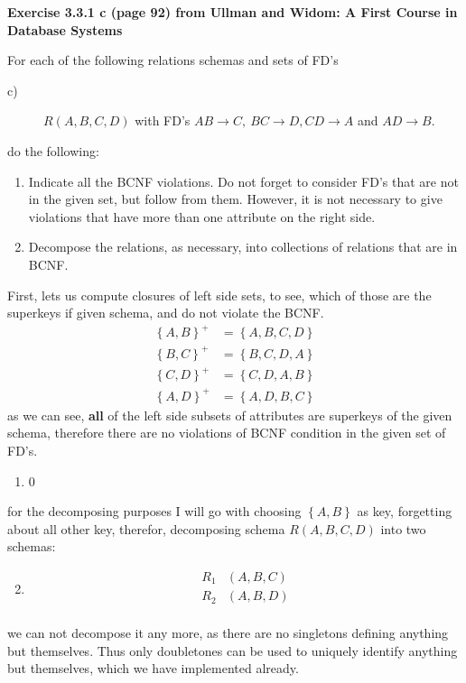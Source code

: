 \documentclass[a4paper]{article}
\newcommand{\set}[1]{\left\{#1\right\}}
\newcommand{\ra}{\rightarrow}
\newenvironment{problem}[1][\unskip]%
{\centering\textbf{ #1}%

\vspace{0.5cm}
\begin{em}}%
{\end{em}}
\newenvironment{answer}%
{\begin{framed}%
\vspace{0.5cm}}%
{\end{framed}\vspace{0.5cm}}
\begin{document}
	\newpage
	\begin{problem}[Exercise 3.3.1 c (page 92) from Ullman and Widom: A First Course in Database Systems]
		For each of the following relations schemas and sets of FD's
		\begin{description}
			\item[c)] $R(A,B,C,D)$ with FD's $AB \ra C,\ BC \ra D, CD \ra A$ and $AD \ra B$.
		\end{description}
		do the following:
		\begin{enumerate}
			\item Indicate all the BCNF violations. Do not forget to consider FD's that are not in the given set, but follow from them. However, it is not necessary to give violations that have more than one attribute on the right side.
			\item Decompose the relations, as necessary, into collections of relations that are in BCNF.
		\end{enumerate}
	\end{problem}
	\begin{answer}
		First, lets us compute closures of left side sets, to see, which of those are the superkeys if given schema, and do not violate the BCNF.
		\begin{align*}
			\set{A,B}^+ &= \set{A,B,C,D} \\
			\set{B,C}^+ &= \set{B,C,D,A} \\
			\set{C,D}^+ &= \set{C,D,A,B} \\
			\set{A,D}^+ &= \set{A,D,B,C}
		\end{align*}
		as we can see, \textbf{all} of the left side subsets of attributes are superkeys of the given schema, therefore there are no violations of BCNF condition in the given set of FD's.
		\begin{enumerate}
			\item 0
		\end{enumerate}

		for the decomposing purposes I will go with choosing $\set{A,B}$ as key, forgetting about all other key, therefor, decomposing schema $R(A,B,C,D)$ into two schemas:
		\begin{enumerate}
			\setcounter{enumi}{1}
			\item \begin{align*}
					R_{1}&(A,B,C) \\
					R_{2}&(A,B,D) \\
				  \end{align*}
		\end{enumerate}
		
		we can not decompose it any more, as there are no singletons defining anything but themselves. Thus only doubletones can be used to uniquely identify anything but themselves, which we have implemented already.

	\end{answer}
\end{document}

